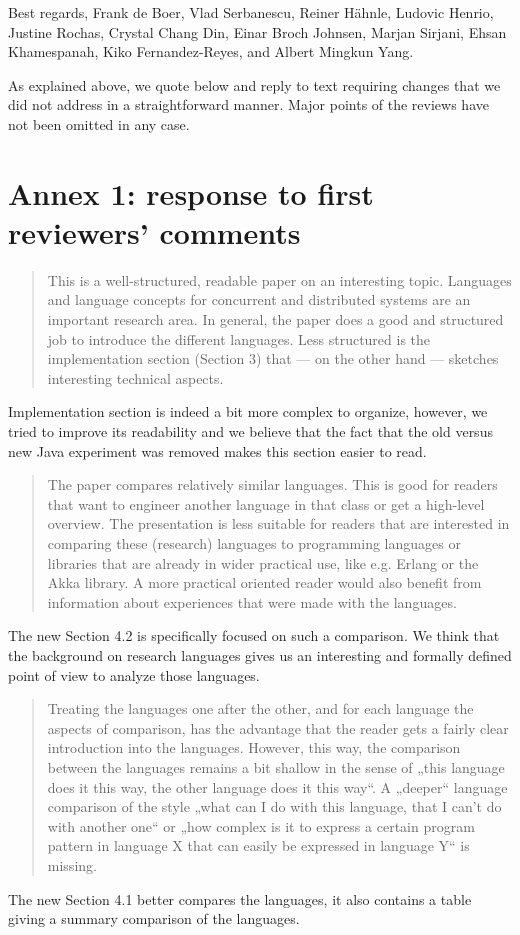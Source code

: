 \documentclass{article}
\begin{document}
\bigskip
\noindent
Best regards,
\newline
\noindent
Frank de Boer, Vlad Serbanescu,
	Reiner H\"ahnle,
	Ludovic Henrio, Justine Rochas,
	Crystal Chang Din, Einar Broch Johnsen,
	Marjan Sirjani,
	Ehsan Khamespanah,
	Kiko Fernandez-Reyes, and Albert Mingkun Yang.

\newpage
As explained above, we quote below and reply to text requiring changes that we did not 
address in a straightforward manner. Major points of the reviews have not been omitted in 
any case.

\section*{Annex 1: response to first reviewers' comments}

\begin{quote}
This is a well-structured, readable paper on an interesting topic. Languages and language 
concepts for concurrent and distributed systems are an important research area. In 
general, the paper does a good and structured job to introduce the different languages. 
Less structured is the implementation section (Section 3) that — on the other hand — 
sketches interesting technical aspects.
\end{quote}
Implementation section is indeed a bit more complex to organize,
however, we tried to improve its readability and we believe that the
fact that the old versus new Java experiment was removed makes this
section easier to read.


\begin{quote}
The paper compares relatively similar languages. This is good for readers that want to 
engineer another language in that class or get a high-level overview. The presentation is 
less suitable for readers that are interested in comparing these (research) languages to 
programming languages or libraries that are already in wider practical use, like e.g. 
Erlang or the Akka library. A more practical oriented reader would also benefit from 
information about experiences that were made with the languages.
\end{quote}
The new Section 4.2 is specifically focused on such a comparison. We think that the 
background on research languages gives us an interesting and formally defined point of 
view to analyze those languages.

\begin{quote}
Treating the languages one after the other, and for each language the aspects of 
comparison, has the advantage that the reader gets a fairly clear introduction into the 
languages. However, this way, the comparison between the languages remains a bit shallow 
in the sense of „this language does it this way, the other language does it this way“. A 
„deeper“ language comparison of the style „what can I do with this language, that I can’t 
do with another one“ or „how complex is it to express a certain program pattern in 
language X that can easily be expressed in language Y“ is missing. 
\end{quote}
The new Section 4.1 better compares the languages, it also contains a table giving a 
summary comparison of the languages.
\end{document}

